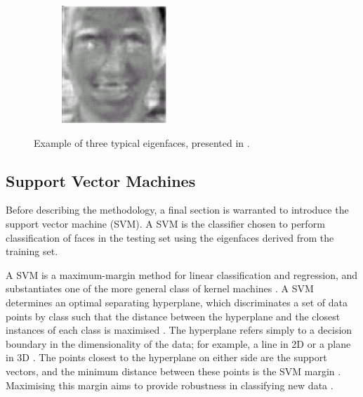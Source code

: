 \begin{figure}[ht]
\begin{subfigure}[b]{0.18\textwidth}
  \end{subfigure}
  \hspace{2em}
  \begin{subfigure}[b]{0.18\textwidth}
    \centering
    \includegraphics[width=\textwidth]{images/q3_eigenface_ex3.png}
  \end{subfigure}
  \caption{Example of three typical eigenfaces, presented in \cite{lovell_2008}.}
  \label{fig:eigenfaces_ex}
\end{figure}

\newpage
\subsection{Support Vector Machines}

Before describing the methodology, a final section is warranted to introduce the support vector machine (SVM). A SVM is the classifier chosen to perform classification of faces in the testing set using the eigenfaces derived from the training set.

A SVM is a maximum-margin method for linear classification and regression, and substantiates one of the more general class of kernel machines \cite{alpaydin_2020}. A SVM determines an optimal separating hyperplane, which discriminates a set of data points by class such that the distance between the hyperplane and the closest instances of each class is maximised \cite{alpaydin_2020}. The hyperplane refers simply to a decision boundary in the dimensionality of the data; for example, a line in 2D or a plane in 3D \cite{gandhi_2018}. The points closest to the hyperplane on either side are the support vectors, and the minimum distance between these points is the SVM margin \cite{gandhi_2018}. Maximising this margin aims to provide robustness in classifying new data \cite{gandhi_2018}.

